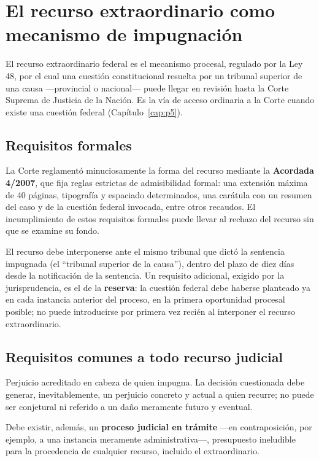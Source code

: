 \documentclass[12pt,oneside]{book}
\begin{document}
\section{El recurso extraordinario como mecanismo de impugnación}

El recurso extraordinario federal es el mecanismo procesal, regulado por la Ley
48, por el cual una cuestión constitucional resuelta por un tribunal superior de
una causa —provincial o nacional— puede llegar en revisión hasta la Corte Suprema
de Justicia de la Nación. Es la vía de acceso ordinaria a la Corte cuando existe
una cuestión federal (Capítulo~\ref{cap:p5}).

\subsection{Requisitos formales}

La Corte reglamentó minuciosamente la forma del recurso mediante la
\textbf{Acordada 4/2007}, que fija reglas estrictas de admisibilidad formal: una
extensión máxima de 40 páginas, tipografía y espaciado determinados, una carátula
con un resumen del caso y de la cuestión federal invocada, entre otros recaudos.
El incumplimiento de estos requisitos formales puede llevar al rechazo del recurso
sin que se examine su fondo.

El recurso debe interponerse ante el mismo tribunal que dictó la sentencia
impugnada (el ``tribunal superior de la causa''), dentro del plazo de diez días
desde la notificación de la sentencia. Un requisito adicional, exigido por la
jurisprudencia, es el de la \textbf{reserva}: la cuestión federal debe haberse
planteado ya en cada instancia anterior del proceso, en la primera oportunidad
procesal posible; no puede introducirse por primera vez recién al interponer el
recurso extraordinario.

\subsection{Requisitos comunes a todo recurso judicial}

\begin{defbox}[: Gravamen]
Perjuicio acreditado en cabeza de quien impugna. La decisión cuestionada debe
generar, inevitablemente, un perjuicio concreto y actual a quien recurre; no puede
ser conjetural ni referido a un daño meramente futuro y eventual.
\end{defbox}

Debe existir, además, un \textbf{proceso judicial en trámite} —en contraposición,
por ejemplo, a una instancia meramente administrativa—, presupuesto ineludible
para la procedencia de cualquier recurso, incluido el extraordinario.
\end{document}
